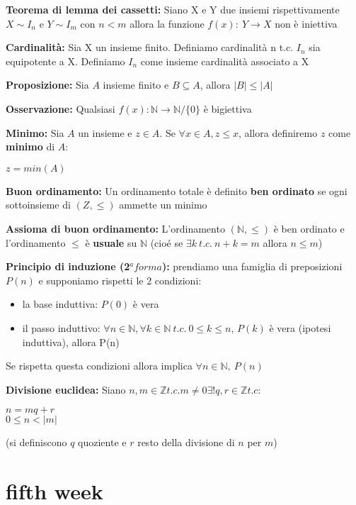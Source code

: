 \documentclass[12pt, a4paper]{article}
\begin{document}
\textbf{Teorema di lemma dei cassetti:} Siano X e Y due insiemi rispettivamente $X\sim I_{n}$ e $Y\sim I_{m}$
con $n<m$ allora la funzione $f(x):\ Y\rightarrow X$ non è iniettiva

\textbf{Cardinalità:} Sia X un insieme finito. Definiamo cardinalità n t.c. $I_{n}$ sia equipotente
a X. Definiamo $I_{n}$ come insieme cardinalità associato a X

\textbf{Proposizione:} Sia $A$ insieme finito e $B\subseteq A$, allora $|B|\leq |A|$

\textbf{Osservazione:} Qualsiasi $f(x): \mathbb{N}\rightarrow\mathbb{N}/\{0\} $ è bigiettiva

\textbf{Minimo:} Sia $A$ un insieme e $z\in A$. Se $\forall x \in A, z\leq x$, allora definiremo $z$ come 
\textbf{minimo} di $A$: 
\begin{center}
    $z = min(A)$
\end{center}

\textbf{Buon ordinamento:} Un ordinamento totale è definito \textbf{ben ordinato} se ogni sottoinsieme di 
$(Z,\leq)$ ammette un minimo

\textbf{Assioma di buon ordinamento:} L'ordinamento $(\mathbb{N},\leq)$ è ben ordinato e l'ordinamento $\leq$
è \textbf{usuale} su $\mathbb{N}$ (cioé se $\exists k\ t.c.\ n+k=m$ allora $n\leq m$)

\textbf{Principio di induzione (2$^{a} forma$):} prendiamo una famiglia di preposizioni $P(n)$ e supponiamo
rispetti le 2 condizioni:
\begin{itemize}
    \item la base induttiva: $P(0)$ è vera
    \item il passo induttivo: $\forall n\in\mathbb{N}, \forall k \in\mathbb{N}\ t.c.\ 0\leq k \leq n$,
    $P(k)$ è vera (ipotesi induttiva), allora P(n)
\end{itemize}
Se rispetta questa condizioni allora implica $\forall n\in\mathbb{N},\ P(n)$

\newpage
\textbf{Divisione euclidea:} Siano $n,m\in\mathbb{Z} t.c. m\neq 0 \exists ! q,r\in\mathbb{Z} t.c:$
\begin{center}
    $n=mq+r$\\$0\leq n <|m|$
\end{center}
(si definiscono $q$ quoziente e $r$ resto della divisione di $n$ per $m$)

\newpage
\section{fifth week}
\end{document}
